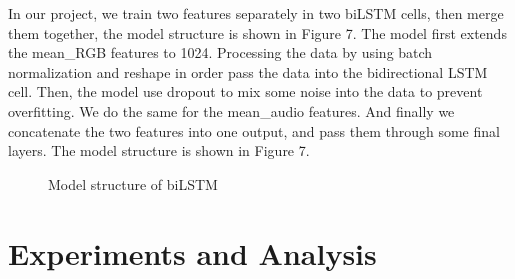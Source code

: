 \documentclass{article}
\begin{document}
In our project, we train two features separately in two biLSTM cells, then merge them together, the model structure is shown in Figure 7. The model first extends the mean\_RGB features to 1024. Processing the data by using batch normalization and reshape in order pass the data into the bidirectional LSTM cell. Then, the model use dropout to mix some noise into the data to prevent overfitting. We do the same for the mean\_audio features. And finally we concatenate the two features into one output, and pass them through some final layers. The model structure is shown in Figure 7.
\begin{figure}[h]
  \centering
  \caption{Model structure of biLSTM}
\end{figure}

\section{Experiments and Analysis}
\end{document}
